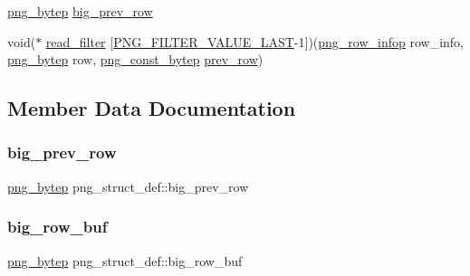 \begin{DoxyCompactItemize}
\item 
\mbox{\hyperlink{pngconf_8h_a759e1c893f977ec7b67820bc3ca37524}{png\+\_\+bytep}} \mbox{\hyperlink{structpng__struct__def_a58ed983872249c948e063743eb18d427}{big\+\_\+prev\+\_\+row}}
\item 
void($\ast$ \mbox{\hyperlink{structpng__struct__def_a669016ed081452035d16f3a93740d663}{read\+\_\+filter}} \mbox{[}\mbox{\hyperlink{png_8h_a9bcc6cc30ac1504e9c194b890c17ad94}{P\+N\+G\+\_\+\+F\+I\+L\+T\+E\+R\+\_\+\+V\+A\+L\+U\+E\+\_\+\+L\+A\+ST}}-\/1\mbox{]})(\mbox{\hyperlink{png_8h_a5c04feca9d1d83a2fd29909c50327dd9}{png\+\_\+row\+\_\+infop}} row\+\_\+info, \mbox{\hyperlink{pngconf_8h_a759e1c893f977ec7b67820bc3ca37524}{png\+\_\+bytep}} row, \mbox{\hyperlink{pngconf_8h_a2e608af822427492832d11909c2f3fee}{png\+\_\+const\+\_\+bytep}} \mbox{\hyperlink{structpng__struct__def_af307f45d48c7900d1036388bccbed7bb}{prev\+\_\+row}})
\end{DoxyCompactItemize}


\subsection{Member Data Documentation}
\mbox{\label{structpng__struct__def_a58ed983872249c948e063743eb18d427}} 
\subsubsection{\texorpdfstring{big\+\_\+prev\+\_\+row}{big\_prev\_row}}
{\footnotesize\ttfamily \mbox{\hyperlink{pngconf_8h_a759e1c893f977ec7b67820bc3ca37524}{png\+\_\+bytep}} png\+\_\+struct\+\_\+def\+::big\+\_\+prev\+\_\+row}

\mbox{\label{structpng__struct__def_a7248deb9bb1525d1d16ee9d6187128b9}} 
\subsubsection{\texorpdfstring{big\+\_\+row\+\_\+buf}{big\_row\_buf}}
{\footnotesize\ttfamily \mbox{\hyperlink{pngconf_8h_a759e1c893f977ec7b67820bc3ca37524}{png\+\_\+bytep}} png\+\_\+struct\+\_\+def\+::big\+\_\+row\+\_\+buf}

